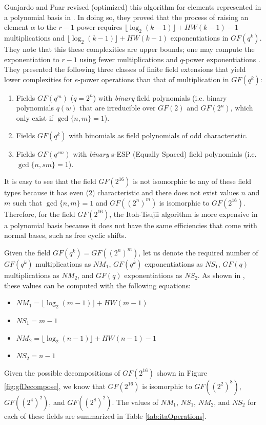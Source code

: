 Guajardo and Paar revised (optimized) this algorithm for elements represented in a polynomial basis in \cite{Jorge02-1}. In doing so, they proved that the process of raising an element $\alpha$ to the $r-1$ power requires $\lfloor \log_2(k-1)\rfloor + HW(k - 1) - 1$ multiplications and $\lfloor \log_2(k-1)\rfloor + HW(k - 1)$ exponentiations in $GF(q^k)$. They note that this these complexities are upper bounds; one may compute the exponentiation to $r - 1$ using fewer multiplications and $q$-power exponentiations \cite{Chung00-1}. They presented the following three classes of finite field extensions that yield lower complexities for $e$-power operations than that of multiplication in $GF(q^k)$:
\begin{enumerate} 
	\item Fields $GF(q^m)$ ($q = 2^n$) with \emph{binary} field polynomials (i.e. binary polynomials $q(w)$ that are irreducible over $GF(2)$ and $GF(2^n)$, which only exist if $\gcd\{n, m\} = 1$).
	\item Fields $GF(q^k)$ with binomials as field polynomials of odd characteristic. 
	\item Fields $GF(q^{sm})$ with \emph{binary} s-ESP (Equally Spaced) field polynomials (i.e. $\gcd\{n,sm\} = 1$). 
\end{enumerate}

It is easy to see that the field  $GF(2^{16})$ is not isomorphic to any of these field types because it has even (2) characteristic and there does not exist values $n$ and $m$ such that $\gcd\{n,m\} = 1$ and $GF((2^n)^m)$ is isomorphic to $GF(2^{16})$. Therefore, for the field $GF(2^{16})$, the Itoh-Tsujii algorithm is more expensive in a polynomial basis because it does not have the same efficiencies that come with normal bases, such as free cyclic shifts. 

Given the field $GF(q^k) = GF((2^n)^m)$, let us denote the required number of $GF(q^k)$ multiplications as $NM_1$, $GF(q^k)$ exponentiations as $NS_1$, $GF(q)$ multiplications as $NM_2$, and $GF(q)$ exponentiations as $NS_2$. As shown in \cite{Itoh88-1}, these values can be computed with the following equations:
\begin{itemize}
	\item $NM_1 = \lfloor \log_2(m - 1)\rfloor + HW(m - 1)$
	\item $NS_1 = m - 1$
	\item $NM_2 = \lfloor \log_2(n - 1)\rfloor + HW(n - 1) - 1$
	\item $NS_2 = n - 1$
\end{itemize}
Given the possible decompositions of $GF(2^{16})$ shown in Figure \ref{fig:gfDecompose}, we know that $GF(2^{16})$ is isomorphic to $GF((2^2)^8)$, $GF((2^4)^2)$, and $GF((2^8)^2)$. The values of $NM_1$, $NS_1$, $NM_2$, and $NS_2$ for each of these fields are summarized in Table \ref{tab:itaOperations}.

